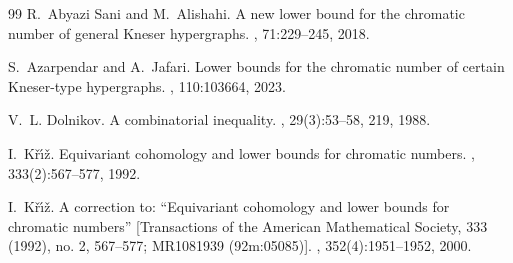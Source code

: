\documentclass[11pt]{amsart}
\theoremstyle{definition}
\begin{document}
\begin{thebibliography}{99}
R.~{Abyazi Sani} and M.~Alishahi.
\newblock A new lower bound for the chromatic number of general {K}neser
  hypergraphs.
, 71:229--245, 2018.

S.~Azarpendar and A.~Jafari.
\newblock Lower bounds for the chromatic number of certain {K}neser-type
  hypergraphs.
, 110:103664, 2023.

V.~L. Dol{\cprime}nikov.
\newblock A combinatorial inequality.
, 29(3):53--58, 219, 1988.

I.~K{\v{r}}{\'{\i}}{\v{z}}.
\newblock Equivariant cohomology and lower bounds for chromatic numbers.
,
  333(2):567--577, 1992.

I.~K{\v{r}}{\'{\i}}{\v{z}}.
\newblock A correction to: ``{E}quivariant cohomology and lower bounds for
  chromatic numbers'' [{T}ransactions of the {A}merican {M}athematical
  {S}ociety, {333} (1992), no. 2, 567--577; {MR}1081939 (92m:05085)].
,
  352(4):1951--1952, 2000.
\end{thebibliography}
\end{document}
